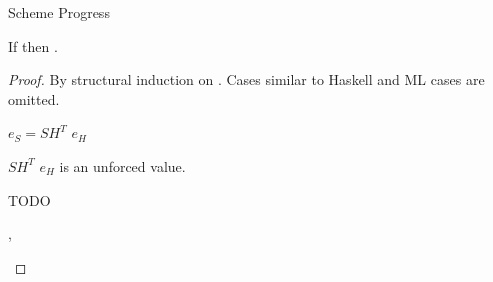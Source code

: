 \begin{theorem}{Scheme Progress}

\label{thmpss}

If \judes{}{\first{\varexps}}{\tytst} then \pshyp{\first{\varexps}}{\second{\varexps}}.

\begin{proof}

By structural induction on \first{\varexps}.  Cases similar to Haskell and ML cases are omitted.


\begin{case}

$e_{S}=SH^{T}$ $e_{H}$

$SH^{T}$ $e_{H}$ is an unforced value.

TODO

\end{case}


\newcommand{\pssm}{\expsm{\first{\varcsm}}{\first{\varexpm}}}

\begin{case}{\pssm}

\pshypby
{\first{\varexpm}}
{\second{\varexpm}}
\pssub
{\first{\varexpm}}
{\second{\varexpm}}
{\pssm}
{\expsm{\first{\varcsm}}{\second{\varexpm}}}
\pserr
{\first{\varexpm}}
{\pssm}
\pscasesone
{\first{\varexpm}}
{\first{\varcsm}}
{\pssm}


\renewcommand{\x}{\expmh{\cslump}{\first{\varcsh}}{\first{\varexph}}}
\renewcommand{\y}{\expms{\cslump}{\first{\varvalfs}}}

\begin{subcase}{\cslump}

\psvalcanin
{\first{\varexpm}}
{\x, \y}
\psred
{\expsm{\cslump}{(\x)}}
{\expwrongd{\errvalue}}
\psred
{\expsm{\cslump}{(\y)}}
{\first{\varvalfs}}

\end{subcase}


\renewcommand{\x}{\first{\expnum{\varnum}}}

\begin{subcase}{\csnum}

\psvalcaneq
{\first{\varexpm}}
{\x}
\psred
{\expsm{\csnum}{\x}}
{\x}

\end{subcase}


\renewcommand{\x}{\cslist{\second{\varcsm}}}
\renewcommand{\y}{\expnils{\first{\vartym}}}
\renewcommand{\z}{\expcons{\first{\varvalum}}{\second{\varvalum}}}


\end{case}
\end{proof}
\end{theorem}
